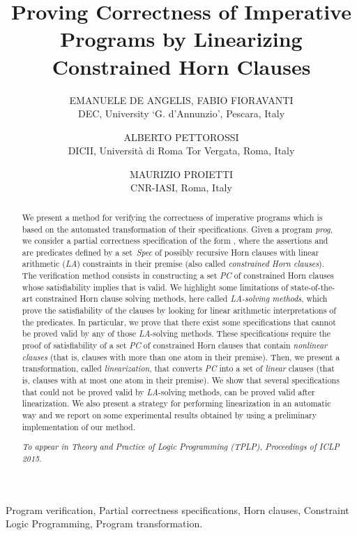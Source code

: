 \documentclass[english]{tlp}
\title{Proving Correctness of Imperative Programs by Linearizing Constrained Horn Clauses}
\author[E. De~Angelis, F. Fioravanti, A. Pettorossi, M. Proietti]
{EMANUELE DE ANGELIS, FABIO FIORAVANTI\\
DEC, University `G. d'Annunzio', Pescara, Italy\\
\email{\{emanuele.deangelis,fabio.fioravanti\}@unich.it}
\and
ALBERTO PETTOROSSI\\
DICII, Universit\`a di Roma Tor Vergata, Roma, Italy\\
\email{pettorossi@disp.uniroma2.it}
\and
MAURIZIO PROIETTI\\
CNR-IASI, Roma, Italy\\
\email{maurizio.proietti@iasi.cnr.it} 
}
\begin{document}
\pagestyle{plain}


\maketitle

\begin{abstract}
We present a method for verifying the correctness of 
imperative programs which is based on the automated transformation 
of their specifications.
Given a program \textit{prog}, we consider a partial correctness 
specification of the form
,
where the assertions  and~ are predicates
defined by a set~\textit{Spec} of possibly recursive 
Horn clauses with linear arithmetic ({\it LA})
constraints in their premise (also called {\it constrained Horn clauses}).
The verification method consists in
constructing  a set \textit{PC} of constrained Horn clauses
whose satisfiability implies that  is valid.
We highlight some limitations of state-of-the-art constrained Horn clause solving
methods, here called {\it{LA-solving methods}}, 
which prove the satisfiability of the clauses  by looking for linear arithmetic interpretations of the 
predicates. 
In particular, we prove that there exist some specifications 
that cannot be 
proved valid by any of those {\it LA}-solving methods. 
These specifications require the proof
of satisfiability of a set \textit{PC} of constrained Horn clauses that contain
{\it nonlinear clauses} (that is, clauses with more than one atom in their premise).
Then, we present a transformation, called {\it linearization}, that 
converts \textit{PC} into
a set of {\it linear} clauses (that is, clauses with at most one 
atom in their premise).
We show that several specifications 
that could not be proved valid by  {\it LA}-solving  methods,
can be proved valid after linearization.
We also present a strategy for performing linearization in an automatic way and
we report on some experimental results obtained by using a preliminary implementation
of our method.

\medskip

\noindent
{\em To appear in Theory and Practice of Logic Programming (TPLP), Proceedings of ICLP 2015.}

\end{abstract}


\begin{keywords}
Program verification,
Partial  correctness specifications,
Horn clauses,
Constraint Logic Programming,
Program transformation.\vspace{-2mm}
\end{keywords}
\end{document}
